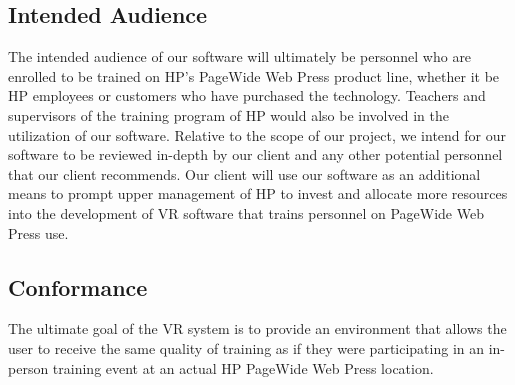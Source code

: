 \documentclass[onecolumn, draftclsnofoot,10pt, compsoc]{IEEEtran}
\begin{document}
\subsection{Intended Audience}
The intended audience of our software will ultimately be personnel who are enrolled to be trained on HP's PageWide Web Press product line, whether it be HP employees or customers who have purchased the technology. Teachers and supervisors of the training program of HP would also be involved in the utilization of our software. Relative to the scope of our project, we intend for our software to be reviewed in-depth by our client and any other potential personnel that our client recommends. Our client will use our software as an additional means to prompt upper management of HP to invest and allocate more resources into the development of VR software that trains personnel on PageWide Web Press use. 
\subsection{Conformance}
The ultimate goal of the VR system is to provide an environment that allows the user to receive the same quality of training as if they were participating in an in-person training event at an actual HP PageWide Web Press location.
\end{document}
